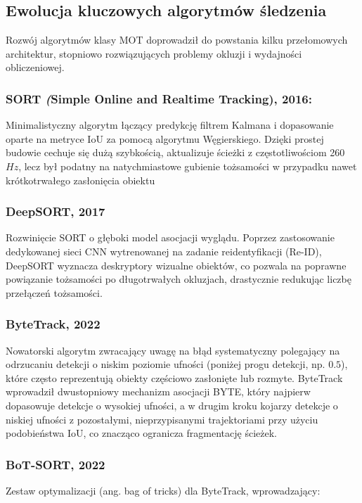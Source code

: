 \subsection{Ewolucja kluczowych algorytmów śledzenia}
Rozwój algorytmów klasy MOT doprowadził do powstania kilku przełomowych architektur, stopniowo
rozwiązujących problemy okluzji i wydajności obliczeniowej.

\subsubsection{SORT \textit(Simple Online and Realtime Tracking), 2016:}
Minimalistyczny algorytm łączący predykcję filtrem Kalmana i dopasowanie oparte na
metryce IoU za pomocą algorytmu Węgierskiego. Dzięki prostej budowie cechuje się dużą szybkością, aktualizuje ścieżki z częstotliwościom 260 $Hz$, lecz był podatny na natychmiastowe gubienie tożsamości w przypadku nawet krótkotrwałego
zasłonięcia obiektu

\subsubsection{DeepSORT, 2017}
Rozwinięcie SORT o głęboki model asocjacji wyglądu. Poprzez zastosowanie dedykowanej sieci CNN
wytrenowanej na zadanie reidentyfikacji (Re-ID), DeepSORT wyznacza deskryptory wizualne obiektów,
co pozwala na poprawne powiązanie tożsamości po długotrwałych okluzjach, drastycznie redukując
liczbę przełączeń tożsamości.

\subsubsection{ByteTrack, 2022}
Nowatorski algorytm zwracający uwagę na błąd systematyczny polegający na odrzucaniu detekcji o
niskim poziomie ufności (poniżej progu detekcji, np. $0.5$), które często reprezentują obiekty
częściowo zasłonięte lub rozmyte. ByteTrack wprowadził dwustopniowy mechanizm asocjacji BYTE, który
najpierw dopasowuje detekcje o wysokiej ufności, a w drugim kroku kojarzy detekcje o niskiej
ufności z pozostałymi, nieprzypisanymi trajektoriami przy użyciu podobieństwa IoU, co znacząco
ogranicza fragmentację ścieżek.

\subsubsection{BoT-SORT, 2022}
Zestaw optymalizacji (ang. bag of tricks) dla ByteTrack, wprowadzający:

